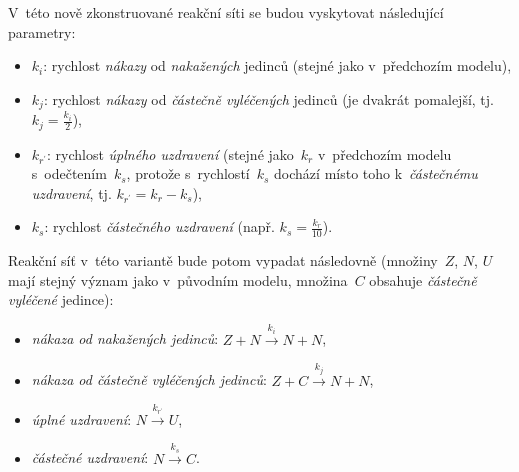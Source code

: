 \documentclass[a4paper, 11pt]{scrartcl}
\begin{document}
    V~této nově zkonstruované reakční síti se budou vyskytovat následující
    parametry:
    \begin{itemize}
        \item
            $ k_i $: rychlost \emph{nákazy} od \emph{nakažených} jedinců
            (stejné jako v~předchozím modelu),

        \item
            $ k_j $: rychlost \emph{nákazy} od \emph{částečně vyléčených}
            jedinců (je dvakrát pomalejší, tj. $ k_j = \frac{k_i}{2} $),

        \item
            $ k_{r^\prime} $: rychlost \emph{úplného uzdravení} (stejné
            jako~$ k_r $ v~předchozím modelu s~odečtením~$ k_s $, protože
            s~rychlostí~$ k_s $ dochází místo toho k~\emph{částečnému
            uzdravení}, tj. $ k_{r^\prime} = k_r - k_s $),

        \item
            $ k_s $: rychlost \emph{částečného uzdravení} (např. $ k_s =
            \frac{k_r}{10} $).
    \end{itemize}
    Reakční síť v~této variantě bude potom vypadat následovně
    (množiny~$ Z $, $ N $, $ U $ mají stejný význam jako v~původním modelu,
    množina~$ C $ obsahuje \emph{částečně vyléčené} jedince):
    \begin{itemize}
        \item
            \emph{nákaza od nakažených jedinců}: $ Z + N \xrightarrow{k_i}
            N + N $,

        \item
            \emph{nákaza od částečně vyléčených jedinců}: $ Z + C
            \xrightarrow{k_j} N + N $,

        \item
            \emph{úplné uzdravení}: $ N \xrightarrow{k_{r^\prime}} U $,


        \item
            \emph{částečné uzdravení}: $ N \xrightarrow{k_s} C $.
    \end{itemize}
\end{document}
